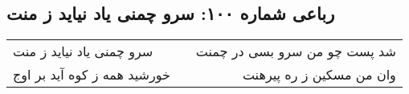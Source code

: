 \begin{center}
\section*{رباعی شماره ۱۰۰: سرو چمنی یاد نیاید ز منت}
\label{sec:sh100}
\begin{longtable}{l p{0.5cm} r}
سرو چمنی یاد نیاید ز منت
&&
شد پست چو من سرو بسی در چمنت
\\
خورشید همه ز کوه آید بر اوج
&&
وان من مسکین ز ره پیرهنت
\\
\end{longtable}
\end{center}

